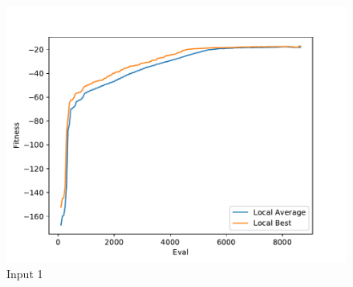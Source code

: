 \documentclass{standalone}
\begin{document}
\begin{figure}[!htb]
	\caption{Input 1}
	\label{fig:graph_1080}
	\includegraphics[width=\textwidth]{../graphs/graphs/1080.pdf}
\end{figure}
\end{document}
